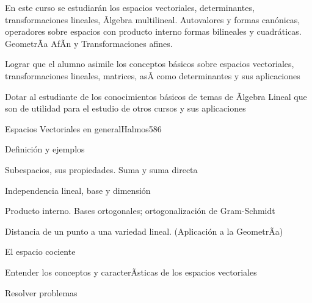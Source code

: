 \begin{syllabus}


\begin{justification}
En este curso se estudiarán los espacios vectoriales, determinantes, transformaciones lineales, Ãlgebra multilineal.
Autovalores y formas canónicas, operadores sobre espacios con producto interno formas bilineales y cuadráticas. GeometrÃ­a AfÃ­n y Transformaciones afines.
\end{justification}

\begin{goals}
\item  Lograr que el alumno asimile los conceptos básicos sobre espacios vectoriales, transformaciones lineales, matrices, asÃ­ como determinantes y sus aplicaciones
\item  Dotar al estudiante de los conocimientos básicos de temas de Ãlgebra Lineal que son de utilidad para el estudio de otros cursos y sus aplicaciones
\end{goals}

\begin{outcomes}
\end{outcomes}

\begin{unit}{Espacios Vectoriales en general}{Halmos58}{6}
   \begin{topics}
         \item  Definición y ejemplos
	 \item  Subespacios, sus propiedades. Suma y suma directa
         \item  Independencia lineal, base y dimensión
	 \item  Producto interno. Bases ortogonales; ortogonalización de Gram-Schmidt
         \item  Distancia de un punto a una variedad lineal. (Aplicación a la GeometrÃ­a)
         \item  El espacio cociente
   \end{topics}

   \begin{unitgoals}
         \item  Entender los conceptos y caracterÃ­sticas de los espacios vectoriales
         \item  Resolver problemas
   \end{unitgoals}
\end{unit}


\end{syllabus}
